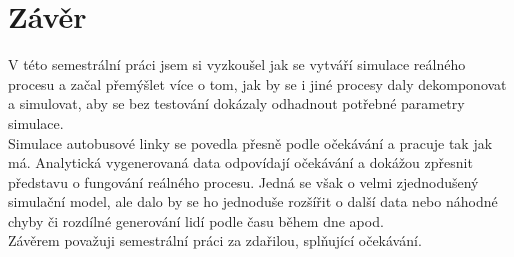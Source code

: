 \documentclass{article}
\begin{document}
	\section{Závěr}
		V této semestrální práci jsem si vyzkoušel jak se vytváří simulace reálného procesu a začal přemýšlet více o tom, jak by se i jiné procesy daly dekomponovat a simulovat, aby se bez testování dokázaly odhadnout potřebné parametry simulace.\\
		Simulace autobusové linky se povedla přesně podle očekávání a pracuje tak jak má. Analytická vygenerovaná data odpovídají očekávání a dokážou zpřesnit představu o fungování reálného procesu. Jedná se však o velmi zjednodušený simulační model, ale dalo by se ho jednoduše rozšířit o další data nebo náhodné chyby či rozdílné generování lidí podle času během dne apod.\\
		Závěrem považuji semestrální práci za zdařilou, splňující očekávání.
		\newpage
\end{document}
